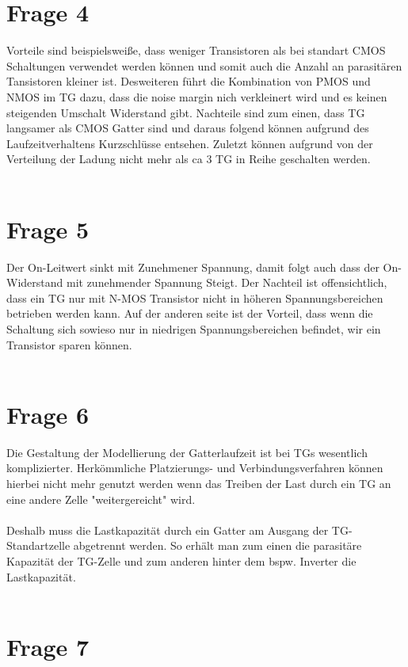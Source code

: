 \documentclass[a4paper]{scrartcl}
\begin{document}
\section*{Frage 4}
Vorteile sind beispielsweiße, dass weniger Transistoren als bei standart CMOS Schaltungen verwendet werden können und somit auch die Anzahl an parasitären Tansistoren kleiner ist. Desweiteren führt die Kombination von PMOS und NMOS im TG dazu, dass die noise margin nich verkleinert wird und es keinen steigenden Umschalt Widerstand gibt.
Nachteile sind zum einen, dass TG langsamer als CMOS Gatter sind und daraus folgend können aufgrund des Laufzeitverhaltens Kurzschlüsse entsehen. Zuletzt können aufgrund von der Verteilung der Ladung nicht mehr als ca 3 TG in Reihe geschalten werden.
~\\
~\\
\section*{Frage 5}
Der On-Leitwert sinkt mit Zunehmener Spannung, damit folgt auch dass der On-Widerstand mit zunehmender Spannung Steigt. Der Nachteil ist offensichtlich, dass ein TG nur mit N-MOS Transistor nicht in höheren Spannungsbereichen betrieben werden kann. Auf der anderen seite ist der Vorteil, dass wenn die Schaltung sich sowieso nur in niedrigen Spannungsbereichen befindet, wir ein Transistor sparen können.
~\\
~\\
\section*{Frage 6}
Die Gestaltung  der Modellierung der Gatterlaufzeit ist bei TGs wesentlich komplizierter. Herkömmliche Platzierungs- und Verbindungsverfahren können hierbei nicht mehr genutzt werden wenn das Treiben der Last durch ein TG an eine andere Zelle "weitergereicht" wird.\\
\\
Deshalb muss die Lastkapazität durch ein Gatter am Ausgang der TG-Standartzelle abgetrennt werden. So erhält man zum einen die parasitäre Kapazität der TG-Zelle und zum anderen hinter dem bspw. Inverter die Lastkapazität.
~\\
~\\
\section*{Frage 7}

~\\
~\\
\end{document}
